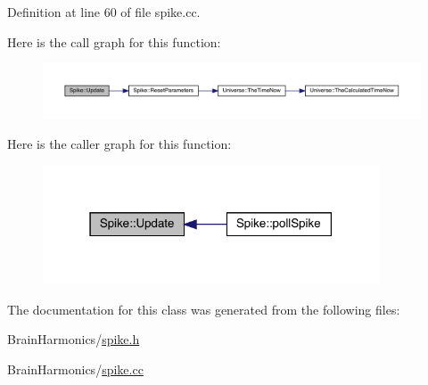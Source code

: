 Definition at line 60 of file spike.\+cc.

Here is the call graph for this function\+:
\nopagebreak
\begin{figure}[H]
\begin{center}
\leavevmode
\includegraphics[width=350pt]{class_spike_a683a0ca5e62e68777381fc85f4bf3019_cgraph}
\end{center}
\end{figure}
Here is the caller graph for this function\+:
\nopagebreak
\begin{figure}[H]
\begin{center}
\leavevmode
\includegraphics[width=283pt]{class_spike_a683a0ca5e62e68777381fc85f4bf3019_icgraph}
\end{center}
\end{figure}


The documentation for this class was generated from the following files\+:\begin{DoxyCompactItemize}
\item 
Brain\+Harmonics/\hyperlink{spike_8h}{spike.\+h}\item 
Brain\+Harmonics/\hyperlink{spike_8cc}{spike.\+cc}\end{DoxyCompactItemize}
